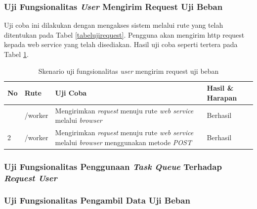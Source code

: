 			\subsubsection{Uji Fungsionalitas \textit{User} Mengirim Request Uji Beban}
				Uji coba ini dilakukan dengan mengakses sistem melalui rute yang telah ditentukan pada Tabel \ref{tabelujirequest}. Pengguna akan mengirim http request kepada web service yang telah
				disediakan. Hasil uji coba seperti tertera pada Tabel \ref{tabelhasilujirequest}.
				\begin{longtable}{|p{}|p{}|p{0.30\textwidth}|p{}|}
					\caption{Skenario uji fungsionalitas \textit{user} mengirim request uji beban} \label{tabelhasilujirequest} \\ \hline
					\textbf{No} & \textbf{Rute} & \textbf{Uji Coba} & \textbf{Hasil \& Harapan} \\ \hline
					\endhead
					\endfoot
					\endlastfoot
					1 & /worker & Mengirimkan \textit{request} menuju rute \textit{web service} melalui \textit{browser} & Berhasil \\ \hline
					2 & /worker & Mengirimkan \textit{request} menuju rute \textit{web service} melalui \textit{browser} menggunakan metode \textit{POST} & Berhasil \\ \hline
				\end{longtable}
				
			\subsubsection{Uji Fungsionalitas Penggunaan \textit{Task Queue} Terhadap \textit{Request User}}
				
			\subsubsection{Uji Fungsionalitas Pengambil Data Uji Beban}
				
